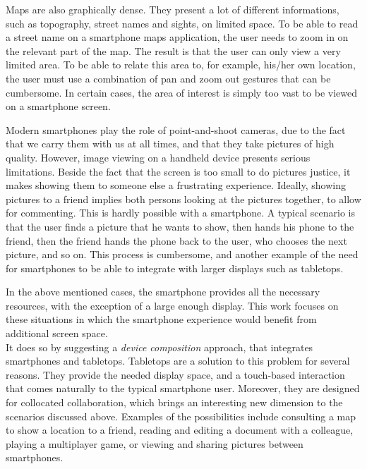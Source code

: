 Maps are also graphically dense.
They present a lot of different informations, such as topography, street names and sights, on limited space.
To be able to read a street name on a smartphone maps application, the user needs to zoom in on the relevant part of the map.
The result is that the user can only view a very limited area.
To be able to relate this area to, for example, his/her own location, the user must use a combination of pan and zoom out gestures that can be cumbersome.
In certain cases, the area of interest is simply too vast to be viewed on a smartphone screen.

Modern smartphones play the role of point-and-shoot cameras, due to the fact that we carry them with us at all times, and that they take pictures of high quality.
However, image viewing on a handheld device presents serious limitations.
Beside the fact that the screen is too small to do pictures justice, it makes showing them to someone else a frustrating experience.
Ideally, showing pictures to a friend implies both persons looking at the pictures together, to allow for commenting.
This is hardly possible with a smartphone.
A typical scenario is that the user finds a picture that he wants to show, then hands his phone to the friend, then the friend hands the phone back to the user, who chooses the next picture, and so on.
This process is cumbersome, and another example of the need for smartphones to be able to integrate with larger displays such as tabletops.

In the above mentioned cases, the smartphone provides all the necessary resources, with the exception of a large enough display.
This work focuses on these situations in which the smartphone experience would benefit from additional screen space.
\\
\linebreak
It does so by suggesting a \emph{device composition} approach, that integrates smartphones and tabletops.
Tabletops are a solution to this problem for several reasons.
They provide the needed display space, and a touch-based interaction that comes naturally to the typical smartphone user.
Moreover, they are designed for collocated collaboration, which brings an interesting new dimension to the scenarios discussed above.
Examples of the possibilities include consulting a map to show a location to a friend, reading and editing a document with a colleague, playing a multiplayer game, or viewing and sharing pictures between smartphones.

